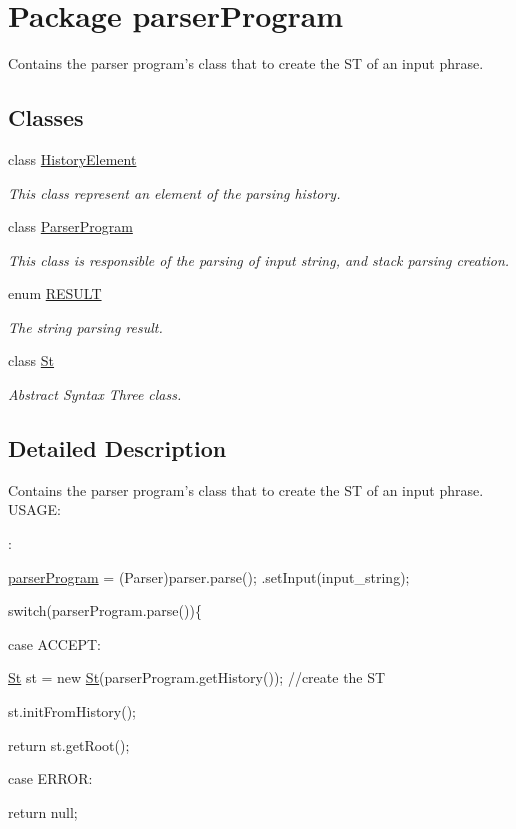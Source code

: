 \hypertarget{namespaceparser_program}{\section{Package parser\-Program}
\label{namespaceparser_program}
}


Contains the parser program's class that to create the S\-T of an input phrase.  


\subsection*{Classes}
\begin{DoxyCompactItemize}
\item 
class \hyperlink{classparser_program_1_1_history_element}{History\-Element}
\begin{DoxyCompactList}\small\item\em This class represent an element of the parsing history. \end{DoxyCompactList}\item 
class \hyperlink{classparser_program_1_1_parser_program}{Parser\-Program}
\begin{DoxyCompactList}\small\item\em This class is responsible of the parsing of input string, and stack parsing creation. \end{DoxyCompactList}\item 
enum \hyperlink{enumparser_program_1_1_r_e_s_u_l_t}{R\-E\-S\-U\-L\-T}
\begin{DoxyCompactList}\small\item\em The string parsing result. \end{DoxyCompactList}\item 
class \hyperlink{classparser_program_1_1_st}{St}
\begin{DoxyCompactList}\small\item\em Abstract Syntax Three class. \end{DoxyCompactList}\end{DoxyCompactItemize}


\subsection{Detailed Description}
Contains the parser program's class that to create the S\-T of an input phrase. U\-S\-A\-G\-E\-:\par
 \-:\par
  \hyperlink{namespaceparser_program}{parser\-Program} = (Parser)parser.\-parse(); .set\-Input(input\-\_\-string); \par
 switch(parser\-Program.\-parse())\{ \par
 case A\-C\-C\-E\-P\-T\-: \par
 \hyperlink{classparser_program_1_1_st}{St} st = new \hyperlink{classparser_program_1_1_st}{St}(parser\-Program.\-get\-History()); //create the S\-T \par
 st.\-init\-From\-History(); \par
 return st.\-get\-Root(); \par
 case E\-R\-R\-O\-R\-: \par
 return null; 